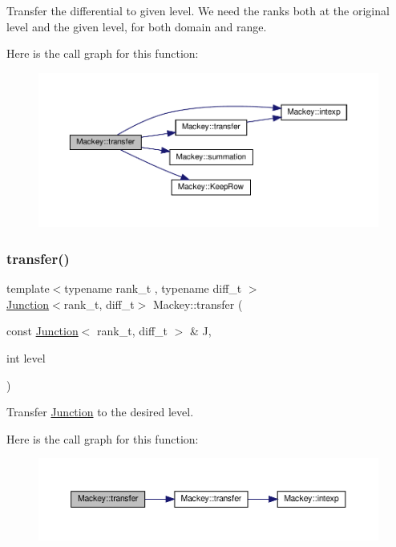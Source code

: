 Transfer the differential to given level. We need the ranks both at the original level and the given level, for both domain and range. 

Here is the call graph for this function\+:\nopagebreak
\begin{figure}[H]
\begin{center}
\leavevmode
\includegraphics[width=350pt]{namespaceMackey_ad7524839b58c80d4b2c54827e4833b12_cgraph}
\end{center}
\end{figure}
\mbox{\label{namespaceMackey_a914aba7f868e67ae3fd9da3995678660}} 
\subsubsection{\texorpdfstring{transfer()}{transfer()}\hspace{0.1cm}{\footnotesize\ttfamily [3/6]}}
{\footnotesize\ttfamily template$<$typename rank\+\_\+t , typename diff\+\_\+t $>$ \\
\hyperlink{classMackey_1_1Junction}{Junction}$<$rank\+\_\+t, diff\+\_\+t$>$ Mackey\+::transfer (\begin{DoxyParamCaption}\item[{const \hyperlink{classMackey_1_1Junction}{Junction}$<$ rank\+\_\+t, diff\+\_\+t $>$ \&}]{J,  }\item[{int}]{level }\end{DoxyParamCaption})}



Transfer \hyperlink{classMackey_1_1Junction}{Junction} to the desired level. 

Here is the call graph for this function\+:\nopagebreak
\begin{figure}[H]
\begin{center}
\leavevmode
\includegraphics[width=350pt]{namespaceMackey_a914aba7f868e67ae3fd9da3995678660_cgraph}
\end{center}
\end{figure}
\mbox{\label{namespaceMackey_a50837580391b5c6705e23c637d742b22}} 

